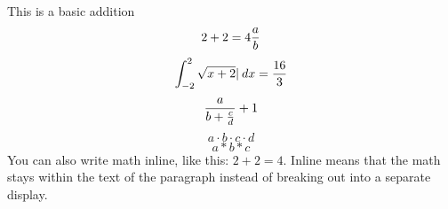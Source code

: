 



This is a basic addition
$$
2 + 2 = 4 
{{a} \over {b}}
$$
$$
\int_{-2}^2 \sqrt{x+2}  |\;dx =\q{16}{3}
$$
$$
{{a} \over {b + {{c} \over {d}}}} + 1
$$
$$
a \cdot b \cdot c \cdot d 
$$
$$
a*b*c
$$
You can also write math inline, like this: $2 + 2 = 4$. Inline means that the
math stays within the text of the paragraph instead of breaking out into a
separate display.

\bye
